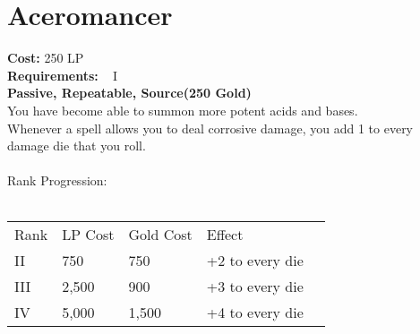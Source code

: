 \section{Aceromancer}\label{perk:aceromancer}
\textbf{Cost:} 250 LP\\
\textbf{Requirements:} ~ I\\
\textbf{Passive, Repeatable, Source(250 Gold)}\\
You have become able to summon more potent acids and bases.\\
Whenever a spell allows you to deal corrosive damage, you add 1 to every damage die that you roll.\\
\\
Rank Progression:\\
\\
\begin{longtable}{l | l | l | l | l}
    Rank & LP Cost & Gold Cost &  Effect\\
    II & 750 & 750 & +2 to every die\\
    III & 2,500 & 900 & +3 to every die\\
    IV & 5,000 & 1,500 & +4 to every die\\
\end{longtable}